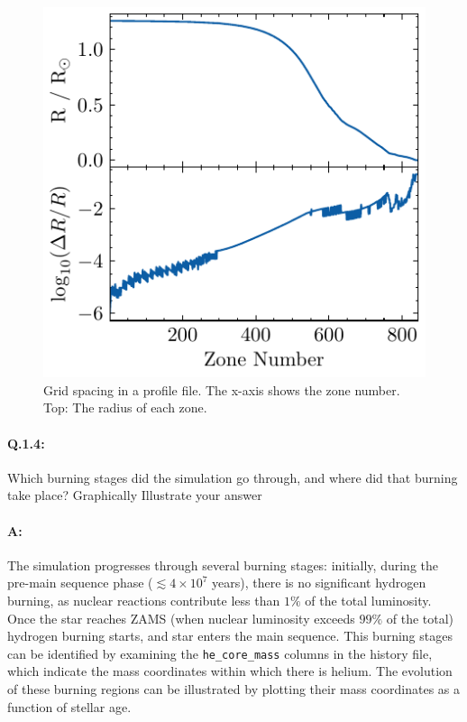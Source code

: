 \documentclass[twocolumn,fontsize=11pt]{scrartcl}
\begin{document}
\begin{figure}[htbp]
    \centering
    \includegraphics{R_vs_zone.pdf}
    \caption{Grid spacing in a profile file. The x-axis shows the zone number. Top: The radius of each zone.}
    \label{fig:grid_spacing}
\end{figure}


\paragraph{Q.1.4:} Which burning stages did the simulation go through, and where did that burning take
place? Graphically Illustrate your answer

\paragraph{A:} The simulation progresses through several burning stages: initially, during the pre-main sequence phase (\(\lesssim 4 \times 10^7\) years), there is no significant hydrogen burning, as nuclear reactions contribute less than \(1\%\) of the total luminosity. Once the star reaches ZAMS (when nuclear luminosity exceeds \(99\%\) of the total) hydrogen burning starts, and star enters the main sequence. This burning stages can be identified by examining the \texttt{he\_core\_mass} columns in the history file, which indicate the mass coordinates within which there is helium. The evolution of these burning regions can be illustrated by plotting their mass coordinates as a function of stellar age.  
\end{document}
